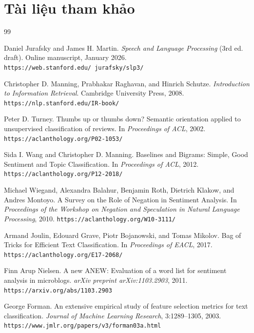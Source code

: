 \documentclass[12pt,a4paper]{article}
\begin{document}
\section*{Tài liệu tham khảo}
\begin{thebibliography}{99}

Daniel Jurafsky and James H. Martin.
\textit{Speech and Language Processing} (3rd ed. draft).
Online manuscript, January 2026.
\newline\texttt{https://web.stanford.edu/~jurafsky/slp3/}

Christopher D. Manning, Prabhakar Raghavan, and Hinrich Schutze.
\textit{Introduction to Information Retrieval}.
Cambridge University Press, 2008.
\newline\texttt{https://nlp.stanford.edu/IR-book/}

Peter D. Turney.
Thumbs up or thumbs down? Semantic orientation applied to unsupervised classification of reviews.
In \textit{Proceedings of ACL}, 2002.
\newline\texttt{https://aclanthology.org/P02-1053/}

Sida I. Wang and Christopher D. Manning.
Baselines and Bigrams: Simple, Good Sentiment and Topic Classification.
In \textit{Proceedings of ACL}, 2012.
\newline\texttt{https://aclanthology.org/P12-2018/}

Michael Wiegand, Alexandra Balahur, Benjamin Roth, Dietrich Klakow, and Andres Montoyo.
A Survey on the Role of Negation in Sentiment Analysis.
In \textit{Proceedings of the Workshop on Negation and Speculation in Natural Language Processing}, 2010.
\newline\texttt{https://aclanthology.org/W10-3111/}

Armand Joulin, Edouard Grave, Piotr Bojanowski, and Tomas Mikolov.
Bag of Tricks for Efficient Text Classification.
In \textit{Proceedings of EACL}, 2017.
\newline\texttt{https://aclanthology.org/E17-2068/}

Finn Arup Nielsen.
A new ANEW: Evaluation of a word list for sentiment analysis in microblogs.
\textit{arXiv preprint arXiv:1103.2903}, 2011.
\newline\texttt{https://arxiv.org/abs/1103.2903}

George Forman.
An extensive empirical study of feature selection metrics for text classification.
\textit{Journal of Machine Learning Research}, 3:1289--1305, 2003.
\newline\texttt{https://www.jmlr.org/papers/v3/forman03a.html}


\end{thebibliography}
\end{document}
